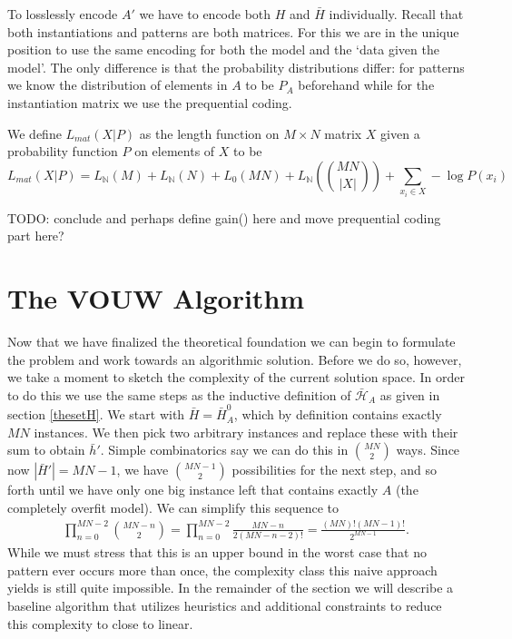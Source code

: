\documentclass{llncs}
\begin{document}
To losslessly encode $A'$ we have to encode both $H$ and $\bar{H}$ individually. Recall that both instantiations and patterns are both matrices. For this we are in the unique position to use the same encoding for both the model and the `data given the model'. The only difference is that the probability distributions differ: for patterns we know the distribution of elements in $A$ to be $P_A$ beforehand while for the instantiation matrix we use the prequential coding.

\begin{definition} We define $L_{mat}( X | P )$ as the length function on $M\times N$ matrix $X$ given a probability function $P$ on elements of $X$ to be
$$
	L_{mat}( X | P ) = L_{\mathbb{N}}(M) + L_{\mathbb{N}}(N) + L_0(MN) + L_{\mathbb{N}}(\binom{MN}{|X|}) + \sum_{x_i \in X} -\log P(x_i)
$$
\end{definition}

TODO: conclude and perhaps define gain() here and move prequential coding part here?

\section{The VOUW Algorithm}

Now that we have finalized the theoretical foundation we can begin to formulate the problem and work towards an algorithmic solution. Before we do so, however, we take a moment to sketch the complexity of the current solution space. In order to do this we use the same steps as the inductive definition of $\bar{\mathcal{H}}_A$ as given in section \ref{thesetH}. We start with $\bar{H}=\bar{H}_A^0$, which by definition contains exactly $MN$ instances. We then pick two arbitrary instances and replace these with their sum to obtain $\bar{h}'$. Simple combinatorics say we can do this in $\binom{MN}{2}$ ways. Since now $|\bar{H}'| = MN-1$, we have $\binom{MN-1}{2}$ possibilities for the next step, and so forth until we have only one big instance left that contains exactly $A$ (the completely overfit model). We can simplify this sequence to
\begin{align}
\displaystyle\prod^{MN-2}_{n=0} \binom{MN-n}{2} = \displaystyle\prod^{MN-2}_{n=0} \frac{MN-n}{2(MN-n-2)!} = \frac{(MN)!(MN-1)!}{2^{MN-1}} .
\end{align}
While we must stress that this is an upper bound in the worst case that no pattern ever occurs more than once, the complexity class this naive approach yields is still quite impossible. In the remainder of the section we will describe a baseline algorithm that utilizes heuristics and additional constraints to reduce this complexity to close to linear.
\end{document}
